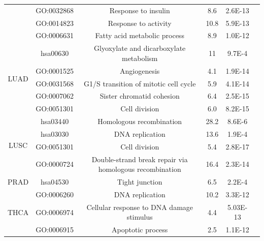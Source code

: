 \begin{table}[h!]
\begin{adjustbox}{max width=\textwidth}
\begin{tabular}{|c|c|c| c c c |c|c|}
                              & GO:0032868 & \multicolumn{3}{c|}{Response to insulin} & 8.6 & 2.6E-13\\
                              & GO:0014823 & \multicolumn{3}{c|}{Response to activity} & 10.8 & 5.9E-13\\
                              & GO:0006631 & \multicolumn{3}{c|}{Fatty acid metabolic process} & 8.9 & 1.0E-12\\
        \hline
        \multirow{5}{*}{LUAD} & hsa00630 & \multicolumn{3}{c|}{Glyoxylate and dicarboxylate metabolism} & 11 & 9.7E-4\\
                              & GO:0001525 & \multicolumn{3}{c|}{Angiogenesis} & 4.1 & 1.9E-14\\
                              & GO:0031568 & \multicolumn{3}{c|}{G1/S transition of mitotic cell cycle} & 5.9 & 4.1E-14\\
                              & GO:0007062 & \multicolumn{3}{c|}{Sister chromatid cohesion} & 6.4 & 2.5E-15\\
                              & GO:0051301 & \multicolumn{3}{c|}{Cell division} & 6.0 & 8.2E-15\\
        \hline
        \multirow{4}{*}{LUSC} & hsa03440 & \multicolumn{3}{c|}{Homologous recombination} & 28.2 & 8.6E-6\\
                              & hsa03030 & \multicolumn{3}{c|}{DNA replication} & 13.6 & 1.9E-4\\
                              & GO:0051301 & \multicolumn{3}{c|}{Cell division} & 5.4 & 2.8E-17\\
                              & GO:0000724 & \multicolumn{3}{c|}{Double-strand break repair via homologous recombination} & 16.4 & 2.3E-14\\
        \hline
        \multirow{1}{*}{PRAD} & hsa04530 & \multicolumn{3}{c|}{Tight junction} & 6.5 & 2.2E-4\\
        \hline
        \multirow{3}{*}{THCA} & GO:0006260 & \multicolumn{3}{c|}{DNA replication} & 10.2 & 3.3E-12\\
                              & GO:0006974 & \multicolumn{3}{c|}{Cellular response to DNA damage stimulus} & 4.4 & 5.03E-13\\
                              & GO:0006915& \multicolumn{3}{c|}{Apoptotic process} & 2.5 & 1.1E-12\\
        \hline
    \end{tabular}
    \end{adjustbox}
\end{table}

